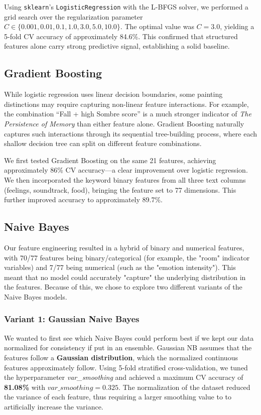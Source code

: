\documentclass[12pt]{article}
\begin{document}
Using \texttt{sklearn}'s \texttt{LogisticRegression} with the L-BFGS solver, we performed a grid search over the regularization parameter $C \in \{0.001, 0.01, 0.1, 1.0, 3.0, 5.0, 10.0\}$. The optimal value was $C = 3.0$, yielding a 5-fold CV accuracy of approximately 84.6\%. This confirmed that structured features alone carry strong predictive signal, establishing a solid baseline.

\subsection*{Gradient Boosting}

While logistic regression uses linear decision boundaries, some painting distinctions may require capturing non-linear feature interactions. For example, the combination ``Fall + high Sombre score'' is a much stronger indicator of \textit{The Persistence of Memory} than either feature alone. Gradient Boosting naturally captures such interactions through its sequential tree-building process, where each shallow decision tree can split on different feature combinations.

We first tested Gradient Boosting on the same 21 features, achieving approximately 86\% CV accuracy---a clear improvement over logistic regression. We then incorporated the keyword binary features from all three text columns (feelings, soundtrack, food), bringing the feature set to 77 dimensions. This further improved accuracy to approximately 89.7\%.


\subsection*{Naive Bayes}
Our feature engineering resulted in a hybrid of binary and numerical features, with 70/77 features being binary/categorical (for example, the "room" indicator variables) and 7/77 being numerical (such as the "emotion intensity"). This meant that no model could accurately "capture" the underlying distribution in the features. Because of this, we chose to explore two different variants of the Naive Bayes models.

\subsubsection*{Variant 1: Gaussian Naive Bayes}
We wanted to first see which Naive Bayes could perform best if we kept our data normalized for consistency if put in an ensemble. Gaussian NB assumes that the features follow a \textbf{Gaussian distribution}, which the normalized continuous features approximately follow. Using 5-fold stratified cross-validation, we tuned the hyperparameter \textit{var\_smoothing} and achieved a maximum CV accuracy of \textbf{81.08\%} with $var\_smoothing = 0.325$. The normalization of the dataset reduced the variance of each feature, thus requiring a larger smoothing value to to artificially increase the variance.
\end{document}
